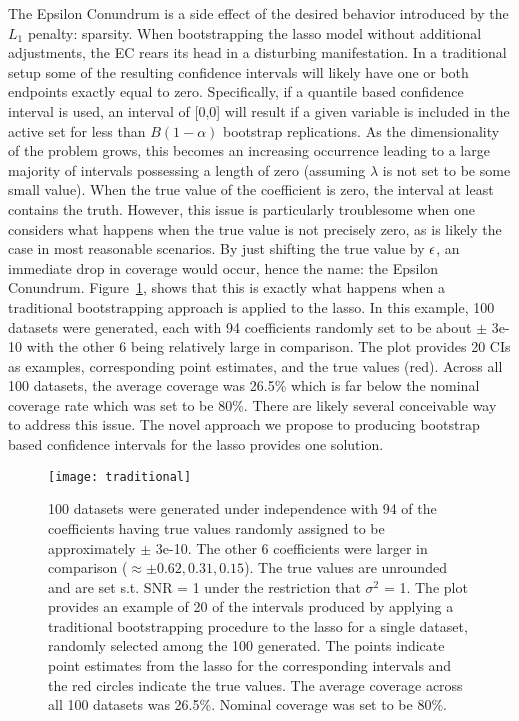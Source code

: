The Epsilon Conundrum is a side effect of the desired behavior introduced by the $L_1$ penalty: sparsity. When bootstrapping the lasso model without additional adjustments, the EC rears its head in a disturbing manifestation. In a traditional setup some of the resulting confidence intervals will likely have one or both endpoints exactly equal to zero. Specifically, if a quantile based confidence interval is used, an interval of [0,0] will result if a given variable is included in the active set for less than $B(1 - \alpha)$ bootstrap replications. As the dimensionality of the problem grows, this becomes an increasing occurrence leading to a large majority of intervals possessing a length of zero (assuming $\lambda$ is not set to be some small value). When the true value of the coefficient is zero, the interval at least contains the truth. However, this issue is particularly troublesome when one considers what happens when the true value is not precisely zero, as is likely the case in most reasonable scenarios. By just shifting the true value by $\epsilon$, an immediate drop in coverage would occur, hence the name: the Epsilon Conundrum. Figure~\ref{Fig:traditional}, shows that this is exactly what happens when a traditional bootstrapping approach is applied to the lasso. In this example, 100 datasets were generated, each with 94 coefficients randomly set to be about $\pm$ 3e-10 with the other 6 being relatively large in comparison. The plot provides 20 CIs as examples, corresponding point estimates, and the true values (red). Across all 100 datasets, the average coverage was 26.5\% which is far below the nominal coverage rate which was set to be 80\%. There are likely several conceivable way to address this issue. The novel approach we propose to producing bootstrap based confidence intervals for the lasso provides one solution.

\begin{figure}[hbtp]
  \begin{center}
    \texttt{[image: traditional]}
    \caption{\label{Fig:traditional} 100 datasets were generated under independence with 94 of the coefficients having true values randomly assigned to be approximately $\pm$ 3e-10. The other 6 coefficients were larger in comparison ($\approx \pm 0.62, 0.31, 0.15$). The true values are unrounded and are set s.t. SNR = 1 under the restriction that $\sigma^2$ = 1. The plot provides an example of 20 of the intervals produced by applying a traditional bootstrapping procedure to the lasso for a single dataset, randomly selected among the 100 generated. The points indicate point estimates from the lasso for the corresponding intervals and the red circles indicate the true values. The average coverage across all 100 datasets was 26.5\%. Nominal coverage was set to be 80\%.}
  \end{center}
  \end{figure}

